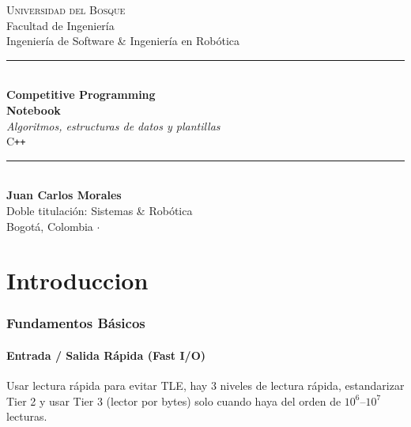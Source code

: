 \documentclass[10pt,a4paper,twocolumn]{article}
\begin{document}
\onecolumn
\thispagestyle{empty}
\begin{titlepage}
  \centering
  \vspace*{\fill}

  {\large\scshape Universidad del Bosque}\\[4pt]
  {\normalsize Facultad de Ingeniería}\\[2pt]
  {\normalsize Ingeniería de Software \& Ingeniería en Robótica}\\[24pt]

  \color{acento}\rule{\linewidth}{1.2pt}\\[8pt]
  {\Huge\bfseries Competitive Programming}\\[10pt]
  {\Huge\bfseries Notebook}\\[10pt]
  {\large\itshape Algoritmos, estructuras de datos y plantillas}\\[8pt]
  {\large C\texttt{++} \quad}\\[6pt]
  \color{acento}\rule{\linewidth}{1.2pt}\\[28pt]

  \color{black}
  {\large\bfseries Juan Carlos Morales}\\[4pt]
  {\normalsize Doble titulación: Sistemas \& Robótica}\\[36pt]

  {\normalsize Bogotá, Colombia \quad$\cdot$}

  \vspace*{\fill}
\end{titlepage}

\thispagestyle{empty}
\tableofcontents
\clearpage

\twocolumn

\part{Introduccion}
\section{Fundamentos Básicos}

\subsection{Entrada / Salida Rápida (Fast I/O)}
Usar lectura rápida para evitar TLE, hay 3 niveles de lectura rápida, estandarizar Tier 2 y usar Tier 3 (lector por
bytes) solo cuando haya del orden de $10^6$--$10^7$ lecturas.
\end{document}
